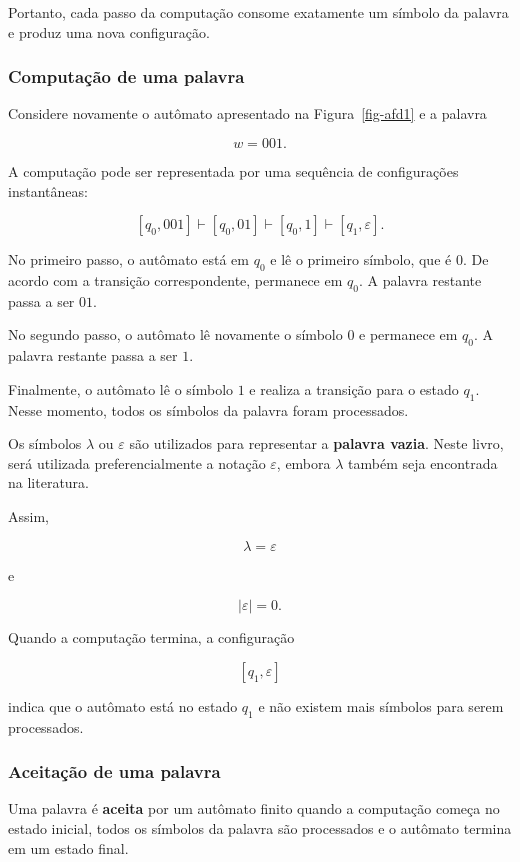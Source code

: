 \documentclass[
  brazilian,
  letterpaper,
]{book}
\theoremstyle{plain}
\theoremstyle{definition}
\theoremstyle{remark}
\begin{document}
Portanto, cada passo da computação consome exatamente um símbolo da
palavra e produz uma nova configuração.

\subsubsection{Computação de uma
palavra}\label{computauxe7uxe3o-de-uma-palavra}

Considere novamente o autômato apresentado na Figura~\ref{fig-afd1} e a
palavra

\[
w=001.
\]

A computação pode ser representada por uma sequência de configurações
instantâneas:

\[
[q_0,001]
\vdash
[q_0,01]
\vdash
[q_0,1]
\vdash
[q_1,\varepsilon].
\]

No primeiro passo, o autômato está em \(q_0\) e lê o primeiro símbolo,
que é \(0\). De acordo com a transição correspondente, permanece em
\(q_0\). A palavra restante passa a ser \(01\).

No segundo passo, o autômato lê novamente o símbolo \(0\) e permanece em
\(q_0\). A palavra restante passa a ser \(1\).

Finalmente, o autômato lê o símbolo \(1\) e realiza a transição para o
estado \(q_1\). Nesse momento, todos os símbolos da palavra foram
processados.

Os símbolos \(\lambda\) ou \(\varepsilon\) são utilizados para
representar a \textbf{palavra vazia}. Neste livro, será utilizada
preferencialmente a notação \(\varepsilon\), embora \(\lambda\) também
seja encontrada na literatura.

Assim,

\[
\lambda=\varepsilon
\]

e

\[
|\varepsilon|=0.
\]

Quando a computação termina, a configuração

\[
[q_1,\varepsilon]
\]

indica que o autômato está no estado \(q_1\) e não existem mais símbolos
para serem processados.

\subsubsection{Aceitação de uma
palavra}\label{aceitauxe7uxe3o-de-uma-palavra}

Uma palavra é \textbf{aceita} por um autômato finito quando a computação
começa no estado inicial, todos os símbolos da palavra são processados e
o autômato termina em um estado final.
\end{document}
